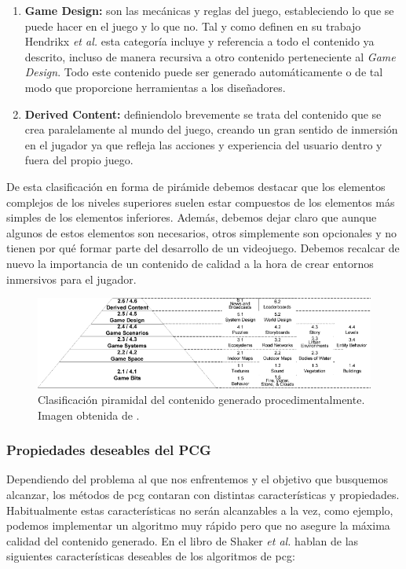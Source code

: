 \begin{enumerate}[label=(\alph*)]
    \item \textbf{Game Design:} son las mecánicas y reglas del juego, estableciendo lo que se puede hacer en el juego y lo que no. Tal y como definen en su trabajo Hendrikx \textit{et al.} esta categoría incluye y referencia a todo el contenido ya descrito, incluso de manera recursiva a otro contenido perteneciente al \textit{Game Design}. Todo este contenido puede ser generado automáticamente o de tal modo que proporcione herramientas a los diseñadores.
    \item \textbf{Derived Content:} definiendolo brevemente se trata del contenido que se crea paralelamente al mundo del juego, creando un gran sentido de inmersión en el jugador ya que refleja las acciones y experiencia del usuario dentro y fuera del propio juego.
\end{enumerate}

De esta clasificación en forma de pirámide debemos destacar que los elementos complejos de los niveles superiores suelen estar compuestos de los elementos más simples de los elementos inferiores. Además, debemos dejar claro que aunque algunos de estos elementos son necesarios, otros simplemente son opcionales y no tienen por qué formar parte del desarrollo de un videojuego. Debemos recalcar de nuevo la importancia de un contenido de calidad a la hora de crear entornos inmersivos para el jugador.\\

\begin{figure}[H]
    \begin{center}
        \includegraphics[scale=0.8]{img/hendrikx2013.png}
        \caption{Clasificación piramidal del contenido generado procedimentalmente. Imagen obtenida de \cite{hendrikx2013}.}
    \end{center}
\end{figure}

\subsubsection{Propiedades deseables del PCG}

Dependiendo del problema al que nos enfrentemos y el objetivo que busquemos alcanzar, los métodos de \acrshort{pcg} contaran con distintas características y propiedades. Habitualmente estas características no serán alcanzables a la vez, como ejemplo, podemos implementar un algoritmo muy rápido pero que no asegure la máxima calidad del contenido generado. En el libro de Shaker \textit{et al.} \cite{shaker2016} hablan de las siguientes características deseables de los algoritmos de \acrshort{pcg}:

